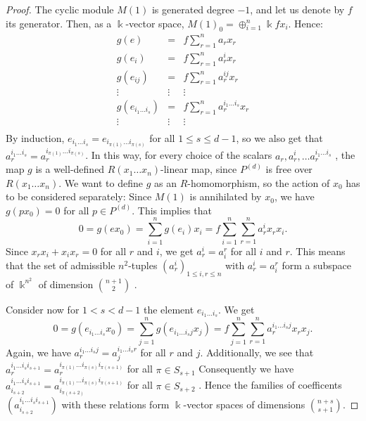 \documentclass[10pt]{amsart}
\begin{document}
\begin{proof}
\smallskip
\noindent The cyclic module $M(1)$ is generated degree $-1$, and let us denote by $f$ its generator. Then,  as a $\Bbbk$-vector space, $M(1)_0 = \oplus_{i=1}^n \Bbbk f x_i$. Hence:
$$\begin{array}{ccc}
g(e)                      & =       &  f\sum_{r=1}^n a_rx_r \\
g(e_i)                   & =       &   f\sum_{r=1}^n a^i_rx_r \\
g(e_{ij})                 & =       &   f\sum_{r=1}^n a^{ij}_rx_r \\
\vdots     &\vdots              &\vdots                                  \\
g(e_{i_1\ldots i_s}) & =       &   f\sum_{r=1}^na^{i_1\ldots i_s}_rx_r \\
\vdots     &\vdots              &\vdots       \\
\end{array}$$
\noindent By induction, $e_{i_1\ldots i_{s}} =  e_{i_{\pi(1)}\ldots i_{\pi(s)}}$ for all $1\leq s\leq d-1$, so we
also get that $a^{i_1\ldots i_s}_r = a^{i_{\pi (1)}\ldots i_{\pi (s)}}_r$. In this way, for every choice of the scalars
$a_r, a_r^i, \ldots a^{i_1\ldots i_s}_r$ , the map $g$ is a well-defined
$R(x_1\ldots x_n)$-linear map,  since $P^{(d)}$ is free over $R(x_1\ldots x_n)$.  We want to define $g$ as an $R$-homomorphism, so the action of $x_0$ has to be considered separately: Since $M(1)$ is annihilated by $x_0$,
we have $g(px_0) =0$ for all $p\in P^{(d)}$.
This implies that $$0 = g(ex_0) = \sum_{i=1}^n g(e_i)x_i=f\sum_{i=1}^n\sum_{r=1}^na^i_rx_r x_i.$$
Since $x_rx_i+x_ix_r=0$ for all $r$ and $i$, we get $a^i_r = a^r_i$ for all $i$ and $r$. This means that the
set of admissible $n^2$-tuples $(a^i_r)_{1\leq i,r\leq n}$ with  $a^i_r = a^r_i$ form a subspace of $\Bbbk^{n^2}$ of dimension
 $\binom{n+1}{2}$ .
 \smallskip
 
\noindent Consider now for $1<s< d-1$  the element $e_{i_1\ldots i_s}$. We get
$$0= g(e_{i_1\ldots i_s}x_0)= \sum_{j=1}^ng(e_{i_1\ldots i_sj}x_j) = f\sum_{j=1}^n\sum_{r=1}^n a^{i_1\ldots i_sj}_rx_r x_j.$$
Again, we have $a^{i_1\ldots i_sj}_r=a^{i_1\ldots i_sr}_j$ for all $r$ and $j$. Additionally, we
see that $a^{i_1\ldots i_si_{s+1}}_r=a^{i_{\pi(1)}\ldots i_{\pi(s)}i_{\pi(s+1)}}_r$ for all $\pi\in S_{s+1}$ Consequently we have 
 $a_{i_{s+2}}^{i_1\ldots i_si_{s+1}}=a^{i_{\pi(1)}\ldots i_{\pi(s)}i_{\pi(s+1)}}_{ i_{\pi (s+2)}}$ for all $\pi\in S_{s+2}$ .
Hence  the families of coefficents   $(a_{i_{s+2}}^{i_1\ldots i_si_{s+1}})$ with these relations form $\Bbbk$-vector
spaces of dimensions $\binom{n+s}{s+1}$.
\smallskip


\end{proof}
\end{document}
